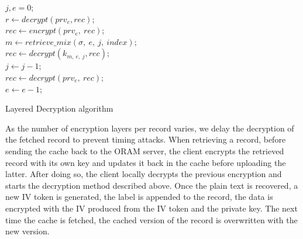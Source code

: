 \documentclass[USenglish,oneside,twocolumn]{article}
\begin{document}
\begin{algorithm}
\DontPrintSemicolon
{}
$j,e=0$;\\
$r\gets decrypt(prv_e,rec)$;\\
{
{
$rec \gets encrypt(prv_e,\ rec)$;\\
{
	$m\gets retrieve\_mix(\sigma,\ e,\ j,\ index)$;\\
	$rec \gets decrypt(k_{m,\ e,\ j}, rec)$;\\
	$j\gets j-1$;\\
}
}
	$rec \gets decrypt(prv_e,\ rec)$;\\
    $e\gets e-1$;\\
}
\caption{Layered Decryption algorithm}
\label{alg:ldec}
\end{algorithm} 
 
As the number of encryption layers per record varies, we delay the decryption of the fetched record to prevent timing attacks. When retrieving a record, before sending the cache back to the ORAM server, the client encrypts the retrieved record with its own key and updates it back in the cache before uploading the latter.
After doing so, the client locally decrypts the previous encryption and starts the decryption method described above. Once the plain text is recovered, a new IV token is generated, the label is appended to the record, the data is encrypted with the IV produced from the IV token and the private key. The next time the cache is fetched, the cached version of the record is overwritten with the new version. \\
\end{document}
